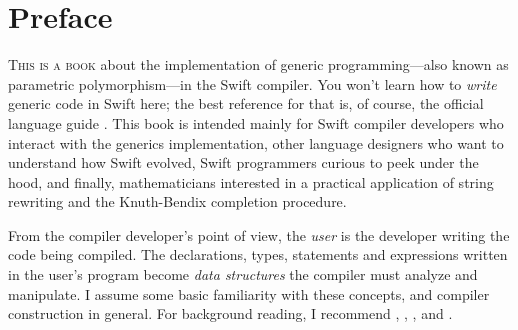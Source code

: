 \documentclass[../generics]{subfiles}
\begin{document}
\chapter*{Preface}


\lettrine{T}{his is a book} about the implementation of generic programming---also known as parametric polymorphism---in the Swift compiler. You won't learn how to \emph{write} generic code in Swift here; the best reference for that is, of course, the official language guide \cite{tspl}. This book is intended mainly for Swift compiler developers who interact with the generics implementation, other language designers who want to understand how Swift evolved, Swift programmers curious to peek under the hood, and finally, mathematicians interested in a practical application of string rewriting and the Knuth-Bendix completion procedure.

From the compiler developer's point of view, the \emph{user} is the developer writing the code being compiled. The declarations, types, statements and expressions written in the user's program become \emph{data structures} the compiler must analyze and manipulate. I assume some basic familiarity with these concepts, and compiler construction in general. For background reading, I recommend \cite{muchnick1997advanced}, \cite{cooper2004engineering}, \cite{craftinginterpreter}, and \cite{incrementalracket}.
\end{document}
